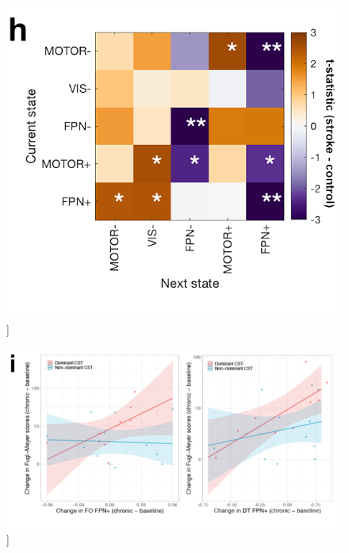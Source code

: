 \documentclass[phd,tocprelim]{cornell}
\renewcommand{\caption}[1]{\singlespacing\hangcaption{#1}\normalspacing}
\begin{document}
\null
\vfill
\clearpage
\null
\vfill
\begin{figure}[h!]
		\ContinuedFloat
		\captionsetup{labelformat=adja-page}
    \centering
    \includegraphics[width=1\textwidth]{chapter2/SupplementaryFig11h.png}
    \caption[]{}
\end{figure}
\null
\vfill
\clearpage
\null
\vfill
\begin{figure}[h!]
		\ContinuedFloat
		\captionsetup{labelformat=adja-page}
    \centering
    \includegraphics[width=1\textwidth]{chapter2/SupplementaryFig11i.png}
    \caption[]{}
\end{figure}
\null
\vfill
\clearpage
\end{document}
